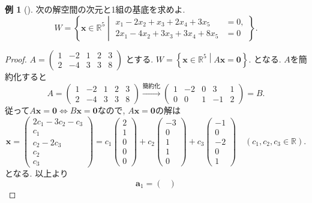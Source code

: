 \documentclass[dvipdfmx,a4paper,11pt]{article} %
\theoremstyle{definition}
\newtheorem{eg}[thm]{例}
\begin{document}
\begin{eg}
[{\cite[例4.4.4]{M}}] 
次の解空間の次元と1組の基底を求めよ.
\[
W=
\left\{
\bm{x}\in\mathbb{R}^5
\mathrel{}\middle|\mathrel{}
\begin{aligned}
x_1-2x_2+x_3+2x_4+3x_5&=0,\\
2x_1-4x_2+3x_3+3x_4+8x_5&=0
\end{aligned}
\right\}.
\]


\begin{proof}
$A=\begin{pmatrix}
1&-2&1&2&3\\
2&-4&3&3&8
\end{pmatrix}$
とする. 
$
W=
\left\{
\bm{x}\in\mathbb{R}^5
\mathrel{}\middle|\mathrel{}
A\bm{x}
=\bm{0}
\right\}.
$
となる. 
$A$を簡約化すると
\[
A=
\begin{pmatrix}
1&-2&1&2&3\\
2&-4&3&3&8
\end{pmatrix}
\overset{\text{簡約化}}{\longrightarrow}
\begin{pmatrix}
1&-2&0&3&1\\
0&0&1&-1&2
\end{pmatrix}
=B.
\]
従って$A\bm{x}
=\bm{0} \iff B\bm{x}
=\bm{0}$なので, $A\bm{x}
=\bm{0}$の解は
\[
\bm{x}=
\begin{pmatrix}
2c_1-3c_2-c_3\\
c_1\\
c_2-2c_3\\
c_2\\
c_3
\end{pmatrix}
=
c_1
\begin{pmatrix}
2\\
1\\
0\\
0\\
0
\end{pmatrix}
+
c_2
\begin{pmatrix}
-3\\
0\\
1\\
1\\
0
\end{pmatrix}
+
c_3
\begin{pmatrix}
-1\\
0\\
-2\\
0\\
1
\end{pmatrix}
\quad(c_1,c_2,c_3\in\mathbb{R}).
\]
となる. 以上より
\[
\bm{a}_1=
\begin{pmatrix}

\end{pmatrix}\]
\end{proof}
\end{eg}
\end{document}
